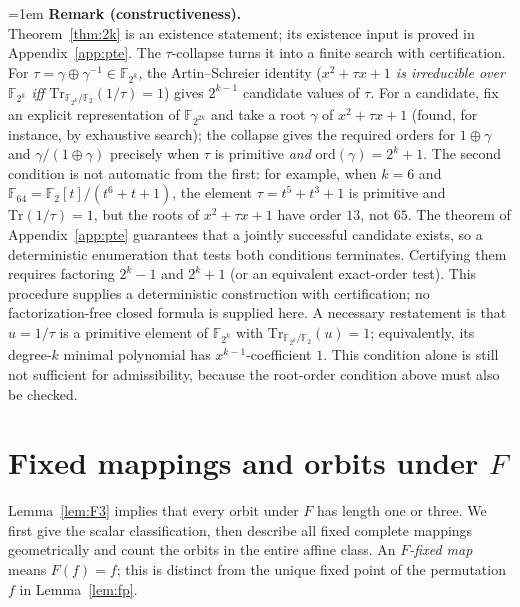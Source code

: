 \documentclass[11pt]{article}
\begin{document}
\begingroup
\emergencystretch=1em
\noindent\textbf{Remark (constructiveness).}\\
Theorem~\ref{thm:2k} is an existence statement; its existence input is proved
in Appendix~\ref{app:pte}. The $\tau$-collapse turns it into a finite search with
certification. For $\tau=\gamma\oplus\gamma^{-1}\in\mathbb{F}_{2^k}$, the
Artin--Schreier identity
(\emph{$x^2+\tau x+1$ is irreducible over $\mathbb{F}_{2^k}$ iff
$\mathrm{Tr}_{\mathbb{F}_{2^k}/\mathbb{F}_2}(1/\tau)=1$}) gives $2^{k-1}$
candidate values of $\tau$. For a candidate, fix an explicit representation of
$\mathbb{F}_{2^{2k}}$ and take a root $\gamma$ of $x^2+\tau x+1$
(found, for instance, by exhaustive search); the collapse gives the required orders for $1\oplus\gamma$ and
$\gamma/(1\oplus\gamma)$ precisely when $\tau$ is primitive \emph{and}
$\mathrm{ord}(\gamma)=2^k+1$. The second condition is not automatic from the
first: for example, when $k=6$ and
$\mathbb{F}_{64}=\mathbb{F}_2[t]/(t^6+t+1)$, the element
$\tau=t^5+t^3+1$ is primitive and $\mathrm{Tr}(1/\tau)=1$, but the roots of
$x^2+\tau x+1$ have order $13$, not $65$. The theorem of
Appendix~\ref{app:pte} guarantees that a jointly successful candidate exists, so a
deterministic enumeration that tests both conditions terminates. Certifying them requires factoring $2^k-1$ and
$2^k+1$ (or an equivalent exact-order test). This procedure supplies a
deterministic construction with certification; no factorization-free closed
formula is supplied here.
A necessary restatement is that $u=1/\tau$ is a primitive element of
$\mathbb{F}_{2^k}$ with $\mathrm{Tr}_{\mathbb{F}_{2^k}/\mathbb{F}_2}(u)=1$;
equivalently, its degree-$k$ minimal polynomial has $x^{k-1}$-coefficient
$1$. This condition alone is still not sufficient for admissibility, because
the root-order condition above must also be checked.
\endgroup

\section[Fixed mappings and orbits under F]{Fixed mappings and orbits under $F$}\label{sec:rem}
Lemma~\ref{lem:F3} implies that every orbit under $F$ has length one or three.
We first give the scalar classification, then describe all fixed complete
mappings geometrically and count the orbits in the entire affine class.
An \emph{$F$-fixed map} means $F(f)=f$; this is distinct from the unique
fixed point of the permutation $f$ in Lemma~\ref{lem:fp}.
\end{document}
